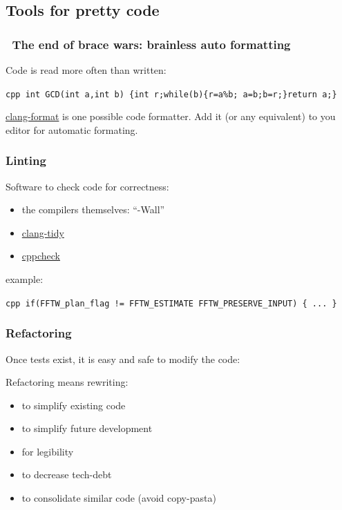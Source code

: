 \subsection{Tools for pretty code}\label{tools-for-pretty-code}

\subsubsection{~The end of brace wars: brainless auto
formatting}\label{the-end-of-brace-wars-brainless-auto-formatting}

Code is read more often than written:

\texttt{cpp int GCD(int a,int b) \{int r;while(b)\{r=a\%b;   a=b;b=r;\}return a;\}}

\href{https://clang.llvm.org/docs/ClangFormat.html}{clang-format} is one
possible code formatter. Add it (or any equivalent) to you editor for
automatic formating.

\subsubsection{Linting}\label{linting}

Software to check code for correctness:

\begin{itemize}
\itemsep1pt\parskip0pt
\item
  the compilers themselves: ``-Wall''
\item
  \href{http://clang.llvm.org/extra/clang-tidy/}{clang-tidy}
\item
  \href{http://cppcheck.sourceforge.net/}{cppcheck}
\end{itemize}

example:

\texttt{cpp   if(FFTW\_plan\_flag != FFTW\_ESTIMATE \textbar{} FFTW\_PRESERVE\_INPUT) \{     ...   \}}

\subsubsection{Refactoring}\label{refactoring}

Once tests exist, it is easy and safe to modify the code:

Refactoring means rewriting:

\begin{itemize}
\itemsep1pt\parskip0pt
\item
  to simplify existing code
\item
  to simplify future development
\item
  for legibility
\item
  to decrease tech-debt
\item
  to consolidate similar code (avoid copy-pasta)
\end{itemize}

